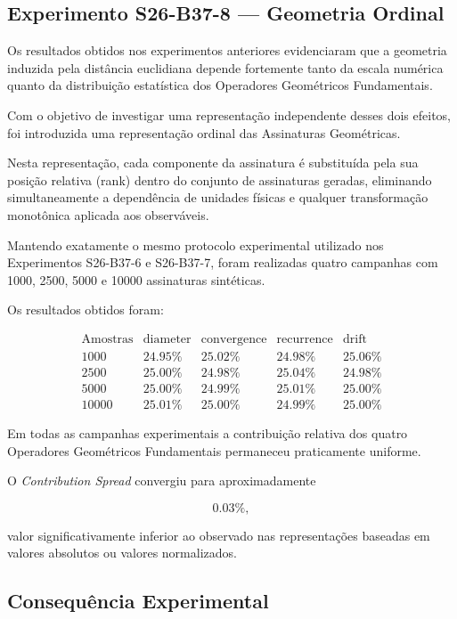 \documentclass[11pt,a4paper]{article}
\begin{document}
\subsection{Experimento S26-B37-8 --- Geometria Ordinal}

Os resultados obtidos nos experimentos anteriores evidenciaram que a
geometria induzida pela distância euclidiana depende fortemente tanto da
escala numérica quanto da distribuição estatística dos Operadores
Geométricos Fundamentais.

Com o objetivo de investigar uma representação independente desses dois
efeitos, foi introduzida uma representação ordinal das Assinaturas
Geométricas.

Nesta representação, cada componente da assinatura é substituída pela sua
posição relativa (rank) dentro do conjunto de assinaturas geradas,
eliminando simultaneamente a dependência de unidades físicas e qualquer
transformação monotônica aplicada aos observáveis.

Mantendo exatamente o mesmo protocolo experimental utilizado nos
Experimentos S26-B37-6 e S26-B37-7, foram realizadas quatro campanhas com
1000, 2500, 5000 e 10000 assinaturas sintéticas.

Os resultados obtidos foram:

\[
\begin{array}{c|cccc}
\text{Amostras}
&
\mathrm{diameter}
&
\mathrm{convergence}
&
\mathrm{recurrence}
&
\mathrm{drift}
\\
\hline
1000
&
24.95\%
&
25.02\%
&
24.98\%
&
25.06\%
\\
2500
&
25.00\%
&
24.98\%
&
25.04\%
&
24.98\%
\\
5000
&
25.00\%
&
24.99\%
&
25.01\%
&
25.00\%
\\
10000
&
25.01\%
&
25.00\%
&
24.99\%
&
25.00\%
\end{array}
\]

Em todas as campanhas experimentais a contribuição relativa dos quatro
Operadores Geométricos Fundamentais permaneceu praticamente uniforme.

O \emph{Contribution Spread} convergiu para aproximadamente

\[
0.03\%,
\]

valor significativamente inferior ao observado nas representações baseadas
em valores absolutos ou valores normalizados.

\subsection{Consequência Experimental}
\end{document}
